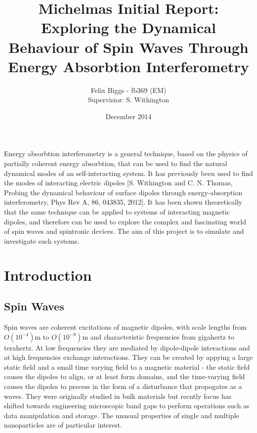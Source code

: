 \documentclass[12pt,twoside,a4paper,english]{article}
\begin{document}
\title{Michelmas Initial Report: Exploring the Dynamical Behaviour of Spin Waves Through Energy Absorbtion Interferometry}
\author{Felix Biggs - fb369 (EM) \\ Supervisior: S. Withington}
\date{December 2014}
\maketitle

\abstract

Energy absorbtion interferometry is a general technique, based on the physics of partially coherent energy absorbtion, that can be used to find the natural dynamical modes of an self-interacting system.
It has previously been used to find the modes of interacting electric dipoles [S. Withington and C. N. Thomas, Probing the dynamical behaviour of surface dipoles through energy-absorption interferometry, Phys Rev A, 86, 043835, 2012].
It has been shown theoretically that the same technique can be applied to systems of interacting magnetic dipoles, and therefore can be used to explore the complex and fascinating world of spin waves and spintronic devices.
The aim of this project is to simulate and investigate such systems.


\section{Introduction}

\subsection{Spin Waves}

Spin waves are coherent excitations of magnetic dipoles, with scale lengths from $O(10^{-4})$m to $O(10^{-8})$m and characteristic frequencies from gigahertz to terahertz. At low frequencies they are mediated by dipole-dipole interactions and at high frequencies exchange interactions.
They can be created by appying a large static field and a small time varying field to a magnetic material - the static field causes the dipoles to align, or at least form domains, and the time-varying field causes the dipoles to precess in the form of a disturbance that propogates as a waves.
They were originally studied in bulk materials but recntly focus has shifted towards engineering microscopic band gaps to perform operations such as data manipulation and storage. The unusual properties of single and multiple nanoparticles are of particular interest.
\end{document}
